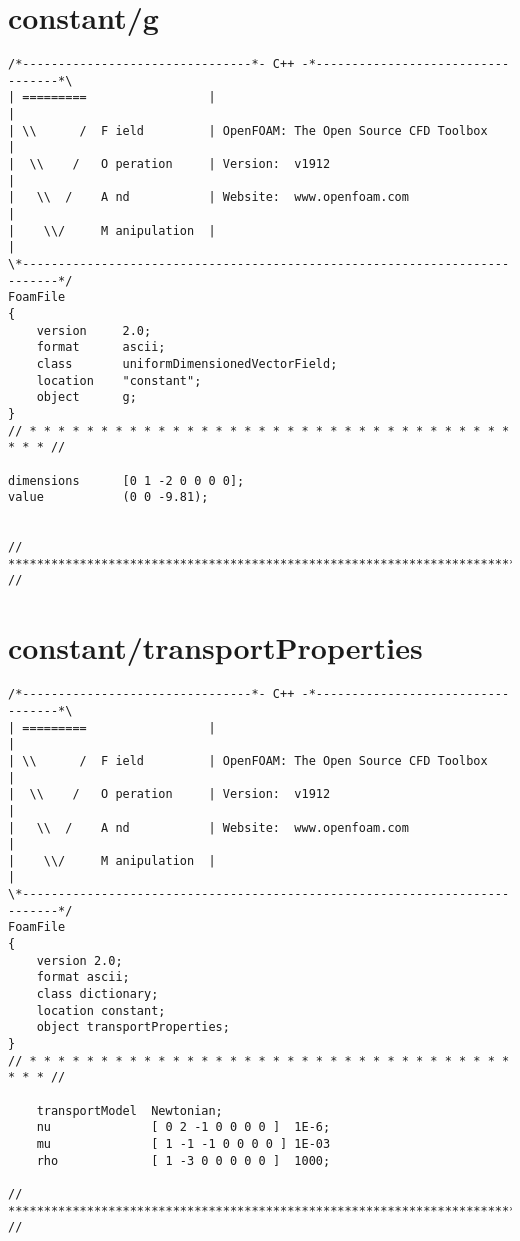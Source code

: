 \section{constant/g}
\begin{lstlisting}
/*--------------------------------*- C++ -*----------------------------------*\
| =========                 |                                                 |
| \\      /  F ield         | OpenFOAM: The Open Source CFD Toolbox           |
|  \\    /   O peration     | Version:  v1912                                 |
|   \\  /    A nd           | Website:  www.openfoam.com                      |
|    \\/     M anipulation  |                                                 |
\*---------------------------------------------------------------------------*/
FoamFile
{
    version     2.0;
    format      ascii;
    class       uniformDimensionedVectorField;
    location    "constant";
    object      g;
}
// * * * * * * * * * * * * * * * * * * * * * * * * * * * * * * * * * * * * * //

dimensions      [0 1 -2 0 0 0 0];
value           (0 0 -9.81);


// ************************************************************************* //

\end{lstlisting}

\section{constant/transportProperties}
\begin{lstlisting}
/*--------------------------------*- C++ -*----------------------------------*\
| =========                 |                                                 |
| \\      /  F ield         | OpenFOAM: The Open Source CFD Toolbox           |
|  \\    /   O peration     | Version:  v1912                                 |
|   \\  /    A nd           | Website:  www.openfoam.com                      |
|    \\/     M anipulation  |                                                 |
\*---------------------------------------------------------------------------*/
FoamFile
{
    version 2.0;
    format ascii;
    class dictionary;
    location constant;
    object transportProperties;
}
// * * * * * * * * * * * * * * * * * * * * * * * * * * * * * * * * * * * * * //

	transportModel  Newtonian;
	nu              [ 0 2 -1 0 0 0 0 ]	1E-6;
	mu				[ 1 -1 -1 0 0 0 0 ]	1E-03
	rho             [ 1 -3 0 0 0 0 0 ]	1000;	

// ************************************************************************* //

\end{lstlisting}

